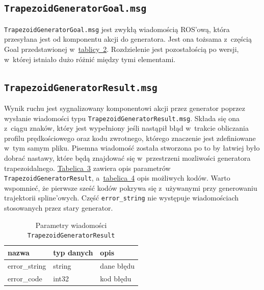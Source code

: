 \documentclass[a4paper, 12pt]{article}
\begin{document}
	\subsection{\texttt{TrapezoidGeneratorGoal.msg}}
	\label{sec:msgsgoal}
	\texttt{TrapezoidGeneratorGoal.msg} jest zwykłą wiadomością ROS'ową, która przesyłana jest od komponentu akcji do generatora. Jest ona tożsama z~częścią Goal przedstawionej w~\hyperref[tab:actionparams]{tablicy~2}. Rozdzielenie jest pozostałością po wersji, w~której istniało dużo różnić między tymi elementami. 
	\subsection{\texttt{TrapezoidGeneratorResult.msg}}
	\label{sec:msgsresult}
	Wynik ruchu jest sygnalizowany komponentowi akcji przez generator poprzez wysłanie wiadomości typu \texttt{TrapezoidGeneratorResult.msg}. Składa się ona z~ciągu znaków, który jest wypełniony jeśli nastąpił błąd w~trakcie obliczania profilu prędkościowego oraz kodu zwrotnego, którego znaczenie jest zdefiniowane w~tym samym pliku. Pisemna wiadomość została stworzona po to by łatwiej było dobrać nastawy, które będą znajdować się w~przestrzeni mozliwości generatora trapezoidalnego. \hyperref[tab:resultparams]{Tabelica~3} zawiera opis parametrów \texttt{TrapezoidGeneratorResult}, a~\hyperref[tab:resultcodes]{tabelica~4} opis możliwych kodów. Warto wspomnieć, że pierwsze sześć kodów pokrywa się z~używanymi przy generowaniu trajektorii spline'owych. Część \texttt{error\_string} nie występuje wiadomościach stosowanych przez stary generator.
	
	\begin{table}[H]
	\label{tab:resultparams}
	\centering
	\begin{tabular}{|m{12em}|m{12em}|m{13em}|}
	\hline
	nazwa & typ danych & opis\\
	\hline
	\hline
	error\_string & string & dane błędu \\  
	\hline
	error\_code & int32 & kod błędu\\
	\hline
	\end{tabular}
	\caption{Parametry wiadomości \texttt{TrapezoidGeneratorResult}}
	\end{table}	
	
\end{document}
